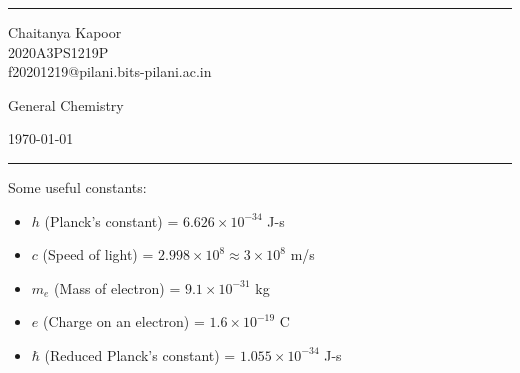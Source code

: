 \documentclass[a4paper]{article}
\begin{document}

\fancyhead[C]{}
\hrule \medskip %
\begin{minipage}{0.295\textwidth} 
\raggedright
\footnotesize
Chaitanya Kapoor \hfill\\   
2020A3PS1219P\hfill\\
f20201219@pilani.bits-pilani.ac.in
\end{minipage}
\begin{minipage}{0.4\textwidth} 
\centering 
\Large
General Chemistry 
\end{minipage}
\begin{minipage}{0.295\textwidth} 
\raggedleft
\today\hfill\\
\end{minipage}
\medskip\hrule 
\bigskip

Some useful constants:
\begin{itemize}
    \item $h$ (Planck's constant) = $6.626\times 10^{-34}$ J-s
    \item $c$ (Speed of light) = $2.998\times 10^8\approx 3\times 10^8$ m/s 
    \item $m_e$ (Mass of electron) = $9.1\times 10^{-31}$ kg
    \item $e$ (Charge on an electron) = $1.6\times 10^{-19}$ C
    \item $\hbar$ (Reduced Planck's constant) = $1.055\times 10^{-34}$ J-s
\end{itemize}
\end{document}
